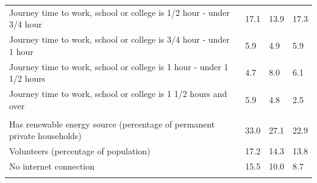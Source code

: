 \documentclass{article}
\begin{document}
\begin{table}[h]
\begin{tabular}{KTTT}
Journey time to work, school or college is 1/2 hour - under 3/4 hour & 17.1& 13.9& 17.3\\
Journey time to work, school or college is 3/4 hour - under 1 hour & 5.9& 4.9& 5.9\\
Journey time to work, school or college is 1 hour - under 1 1/2 hours & 4.7& 8.0& 6.1\\
Journey time to work, school or college is 1 1/2 hours and over & 5.9& 4.8& 2.5\\
\hline
    \\ 
    \hline
Has renewable energy source (percentage of permanent private households) & 33.0& 27.1& 22.9\\
    \hline
Volunteers (percentage of population) & 17.2& 14.3& 13.8\\
    \hline
No internet connection& 15.5& 10.0&  8.7\\
\hline
\end{tabular}
\end{table}
\end{document}
